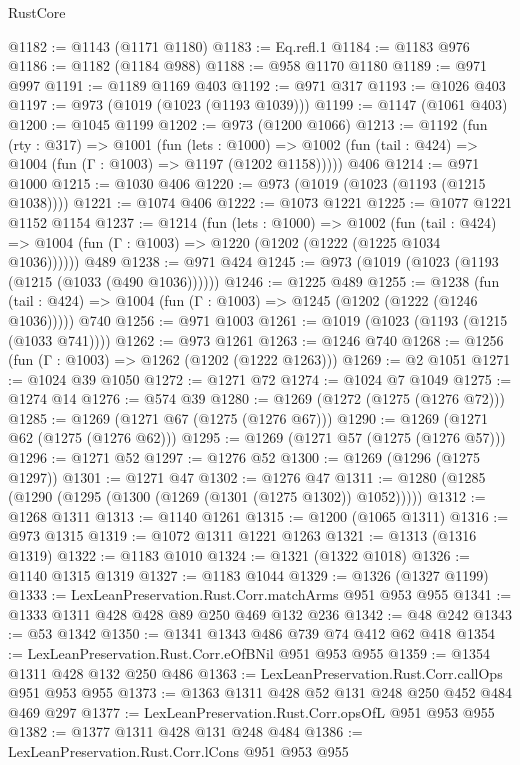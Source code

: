 \begin{lexlean}{RustCore}
\begin{coremodule}
@1182 := @1143 (@1171 @1180)
@1183 := Eq.refl.{1}
@1184 := @1183 @976
@1186 := @1182 (@1184 @988)
@1188 := @958 @1170 @1180
@1189 := @971 @997
@1191 := @1189 @1169 @403
@1192 := @971 @317
@1193 := @1026 @403
@1197 := @973 (@1019 (@1023 (@1193 @1039)))
@1199 := @1147 (@1061 @403)
@1200 := @1045 @1199
@1202 := @973 (@1200 @1066)
@1213 := @1192
    (fun (rty : @317) =>
    @1001
      (fun (lets : @1000) =>
      @1002 (fun (tail : @424) => @1004 (fun (Γ : @1003) => @1197 (@1202 @1158)))))
    @406
@1214 := @971 @1000
@1215 := @1030 @406
@1220 := @973 (@1019 (@1023 (@1193 (@1215 @1038))))
@1221 := @1074 @406
@1222 := @1073 @1221
@1225 := @1077 @1221 @1152 @1154
@1237 := @1214
    (fun (lets : @1000) =>
    @1002
      (fun (tail : @424) => @1004 (fun (Γ : @1003) => @1220 (@1202 (@1222 (@1225 @1034 @1036))))))
    @489
@1238 := @971 @424
@1245 := @973 (@1019 (@1023 (@1193 (@1215 (@1033 (@490 @1036))))))
@1246 := @1225 @489
@1255 := @1238
    (fun (tail : @424) => @1004 (fun (Γ : @1003) => @1245 (@1202 (@1222 (@1246 @1036)))))
    @740
@1256 := @971 @1003
@1261 := @1019 (@1023 (@1193 (@1215 (@1033 @741))))
@1262 := @973 @1261
@1263 := @1246 @740
@1268 := @1256 (fun (Γ : @1003) => @1262 (@1202 (@1222 @1263)))
@1269 := @2 @1051
@1271 := @1024 @39 @1050
@1272 := @1271 @72
@1274 := @1024 @7 @1049
@1275 := @1274 @14
@1276 := @574 @39
@1280 := @1269 (@1272 (@1275 (@1276 @72)))
@1285 := @1269 (@1271 @67 (@1275 (@1276 @67)))
@1290 := @1269 (@1271 @62 (@1275 (@1276 @62)))
@1295 := @1269 (@1271 @57 (@1275 (@1276 @57)))
@1296 := @1271 @52
@1297 := @1276 @52
@1300 := @1269 (@1296 (@1275 @1297))
@1301 := @1271 @47
@1302 := @1276 @47
@1311 := @1280 (@1285 (@1290 (@1295 (@1300 (@1269 (@1301 (@1275 @1302)) @1052)))))
@1312 := @1268 @1311
@1313 := @1140 @1261
@1315 := @1200 (@1065 @1311)
@1316 := @973 @1315
@1319 := @1072 @1311 @1221 @1263
@1321 := @1313 (@1316 @1319)
@1322 := @1183 @1010
@1324 := @1321 (@1322 @1018)
@1326 := @1140 @1315 @1319
@1327 := @1183 @1044
@1329 := @1326 (@1327 @1199)
@1333 := LexLeanPreservation.Rust.Corr.matchArms @951 @953 @955
@1341 := @1333 @1311 @428 @428 @89 @250 @469 @132 @236
@1342 := @48 @242
@1343 := @53 @1342
@1350 := @1341 @1343 @486 @739 @74 @412 @62 @418
@1354 := LexLeanPreservation.Rust.Corr.eOfBNil @951 @953 @955
@1359 := @1354 @1311 @428 @132 @250 @486
@1363 := LexLeanPreservation.Rust.Corr.callOps @951 @953 @955
@1373 := @1363 @1311 @428 @52 @131 @248 @250 @452 @484 @469 @297
@1377 := LexLeanPreservation.Rust.Corr.opsOfL @951 @953 @955
@1382 := @1377 @1311 @428 @131 @248 @484
@1386 := LexLeanPreservation.Rust.Corr.lCons @951 @953 @955

\end{coremodule}
\end{lexlean}
